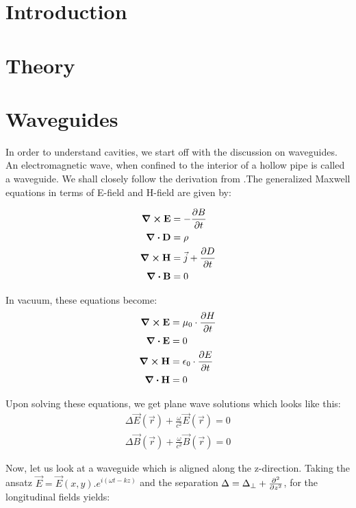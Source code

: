 \documentclass[a4paper]{article}
\numberwithin{equation}{section}
\begin{document}
\section{Introduction}



\section{Theory}


\section{Waveguides}
In order to understand cavities, we start off with the discussion on waveguides. An electromagnetic wave, when confined to the interior of a hollow pipe is called a waveguide. We shall closely follow the derivation from \cite{}.The generalized Maxwell equations in terms of E-field and H-field are given by:

\begin{align}
		\curl {\vb{{E}}} &= - \pdv{{B}}{t} \\
		\div{\vb{D}} &= \rho \\
		\curl {\vb{{H}}} &= \vec{j} + \pdv{{D}}{t} \\
		\div{\vb{{B}}} &= 0 
\end{align}

In vacuum, these equations become: 
\begin{align}
		\curl {\vb{{E}}} &= \mu_0 \cdot \pdv{{H}}{t} \\ 
		\div{\vb{{E}}} &= 0 \\
		\curl {\vb{{H}}} &= \epsilon_{0} \cdot \pdv{{E}}{t} \\
		\div{\vb{{H}}} &= 0
\end{align}

Upon solving these equations, we get plane wave solutions which looks like this: 
\begin{align*}
		\Delta \vec{E}\left(\vec{r}\right) + \frac{\omega}{c^2} \vec{E}\left(\vec{r}\right) = 0 \\
		\Delta \vec{B}\left(\vec{r}\right) + \frac{\omega}{c^2} \vec{B}\left(\vec{r}\right) = 0 
\end{align*}

Now, let us look at a waveguide which is aligned along the z-direction. Taking the ansatz $\vec{E} = \vec{E}(x,y).e^{i(\omega t -kz)}$ and the separation $\Delta = \Delta_{\perp} + \pdv[2]{}{z}$, for the longitudinal fields yields: 
\end{document}
